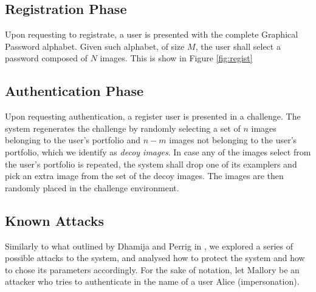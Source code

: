 \documentclass[11pt,a4paper]{article}
\theoremstyle{defn, nobreak=true}
\begin{document}
\subsection{Registration Phase} \label{subsec:regist}

Upon requesting to registrate, a user is presented with the complete Graphical Password alphabet. Given such alphabet, of size $M$, the user shall select a password composed of $N$ images. This is show in Figure \ref{fig:regist}

\subsection{Authentication Phase} \label{subsec:authen}

Upon requesting authentication, a register user is presented in a challenge. The system regenerates the challenge by randomly selecting a set of $n$ images belonging to the user's portfolio and $n-m$ images not belonging to the user's portfolio, which we identify as \textit{decoy images}. In case any of the images select from the user's portfolio is repeated, the system shall drop one of its examplers and pick an extra image from the set of the decoy images. The images are then randomly placed in the challenge environment. 


\subsection{Known Attacks} \label{subsec:attacks}

Similarly to what outlined by Dhamija and Perrig in \cite{dejavu}, we explored a series of possible attacks to the system, and analysed how to protect the system and how to chose its parameters accordingly. For the sake of notation, let Mallory be an attacker who tries to authenticate in the name of a user Alice (impersonation).
\end{document}
